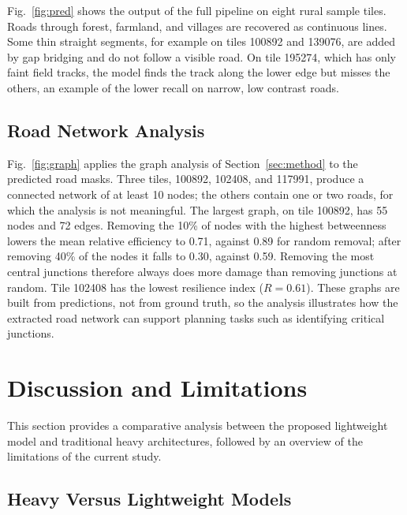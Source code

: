 \documentclass{ieeeaccess}
\begin{document}
Fig.~\ref{fig:pred} shows the output of the full pipeline on eight rural sample tiles. Roads through forest, farmland, and villages are recovered as continuous lines. Some thin straight segments, for example on tiles 100892 and 139076, are added by gap bridging and do not follow a visible road. On tile 195274, which has only faint field tracks, the model finds the track along the lower edge but misses the others, an example of the lower recall on narrow, low contrast roads.

\subsection{Road Network Analysis}

Fig.~\ref{fig:graph} applies the graph analysis of Section~\ref{sec:method} to the predicted road masks. Three tiles, 100892, 102408, and 117991, produce a connected network of at least 10 nodes; the others contain one or two roads, for which the analysis is not meaningful. The largest graph, on tile 100892, has 55 nodes and 72 edges. Removing the 10\% of nodes with the highest betweenness lowers the mean relative efficiency to 0.71, against 0.89 for random removal; after removing 40\% of the nodes it falls to 0.30, against 0.59. Removing the most central junctions therefore always does more damage than removing junctions at random. Tile 102408 has the lowest resilience index ($R = 0.61$). These graphs are built from predictions, not from ground truth, so the analysis illustrates how the extracted road network can support planning tasks such as identifying critical junctions.


\section{Discussion and Limitations}
\label{sec:discussion}

This section provides a comparative analysis between the proposed lightweight model and traditional heavy architectures, followed by an overview of the limitations of the current study.

\subsection{Heavy Versus Lightweight Models}
\end{document}
